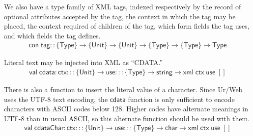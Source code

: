 \documentclass{article}
\newcommand{\mt}[1]{\mathsf{#1}}
\begin{document}
We also have a type family of XML tags, indexed respectively by the record of optional attributes accepted by the tag, the context in which the tag may be placed, the context required of children of the tag, which form fields the tag uses, and which fields the tag defines.
$$\begin{array}{l}
  \mt{con} \; \mt{tag} :: \{\mt{Type}\} \to \{\mt{Unit}\} \to \{\mt{Unit}\} \to \{\mt{Type}\} \to \{\mt{Type}\} \to \mt{Type}
\end{array}$$

Literal text may be injected into XML as ``CDATA.''
$$\begin{array}{l}
  \mt{val} \; \mt{cdata} : \mt{ctx} ::: \{\mt{Unit}\} \to \mt{use} ::: \{\mt{Type}\} \to \mt{string} \to \mt{xml} \; \mt{ctx} \; \mt{use} \; []
\end{array}$$

There is also a function to insert the literal value of a character.  Since Ur/Web uses the UTF-8 text encoding, the $\mt{cdata}$ function is only sufficient to encode characters with ASCII codes below 128.  Higher codes have alternate meanings in UTF-8 than in usual ASCII, so this alternate function should be used with them.
$$\begin{array}{l}
  \mt{val} \; \mt{cdataChar} : \mt{ctx} ::: \{\mt{Unit}\} \to \mt{use} ::: \{\mt{Type}\} \to \mt{char} \to \mt{xml} \; \mt{ctx} \; \mt{use} \; []
\end{array}$$
\end{document}
